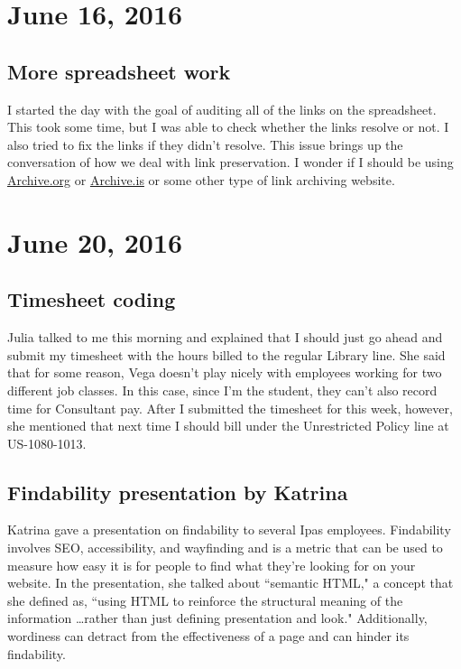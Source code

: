 \documentclass{article}
\begin{document}
\section{June 16, 2016}
\subsection{More spreadsheet work}
I started the day with the goal of auditing all of the links on the spreadsheet. This took some time, but I was able to check whether the links resolve or not. I also tried to fix the links if they didn't resolve. This issue brings up the conversation of how we deal with link preservation. I wonder if I should be using \href{http://archive.org/web/}{Archive.org} or \href{http://archive.is/}{Archive.is} or some other type of link archiving website. 

\section{June 20, 2016}
\subsection{Timesheet coding}
Julia talked to me this morning and explained that I should just go ahead and submit my timesheet with the hours billed to the regular Library line. She said that for some reason, Vega doesn't play nicely with employees working for two different job classes. In this case, since I'm the student, they can't also record time for Consultant pay. After I submitted the timesheet for this week, however, she mentioned that next time I should bill under the Unrestricted Policy line at US-1080-1013.
\subsection{Findability presentation by Katrina}
Katrina gave a presentation on findability to several Ipas employees. Findability involves SEO, accessibility, and wayfinding and is a metric that can be used to measure how easy it is for people to find what they're looking for on your website. In the presentation, she talked about ``semantic HTML," a concept that she defined as, ``using HTML to reinforce the structural meaning of the information \dots rather than just defining presentation and look." Additionally, wordiness can detract from the effectiveness of a page and can hinder its findability. 
\end{document}
